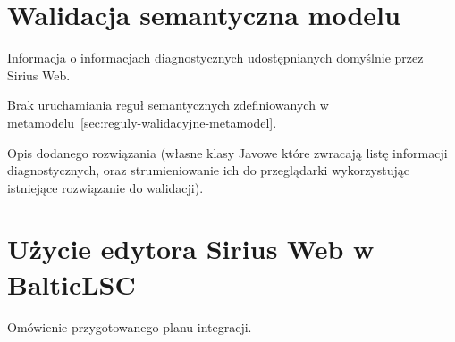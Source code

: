 \section{Walidacja semantyczna modelu}

Informacja o informacjach diagnostycznych udostępnianych domyślnie przez Sirius
Web.

Brak uruchamiania reguł semantycznych zdefiniowanych w
metamodelu~\ref{sec:reguly-walidacyjne-metamodel}.

Opis dodanego rozwiązania (własne klasy Javowe które zwracają listę informacji
diagnostycznych, oraz strumieniowanie ich do przeglądarki wykorzystując
istniejące rozwiązanie do walidacji).

\section{Użycie edytora Sirius Web w
  BalticLSC}\label{sec:uzycie-sirius-web-w-balcitlsc}

Omówienie przygotowanego planu integracji.
